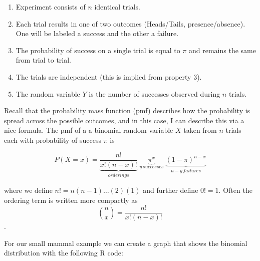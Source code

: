 \documentclass[]{book}
\newenvironment{Shaded}{\begin{snugshade}}{\end{snugshade}}
\newcommand{\KeywordTok}[1]{\textcolor[rgb]{0.13,0.29,0.53}{\textbf{{#1}}}}
\newcommand{\DataTypeTok}[1]{\textcolor[rgb]{0.13,0.29,0.53}{{#1}}}
\newcommand{\DecValTok}[1]{\textcolor[rgb]{0.00,0.00,0.81}{{#1}}}
\newcommand{\FloatTok}[1]{\textcolor[rgb]{0.00,0.00,0.81}{{#1}}}
\newcommand{\StringTok}[1]{\textcolor[rgb]{0.31,0.60,0.02}{{#1}}}
\newcommand{\NormalTok}[1]{{#1}}
\providecommand{\tightlist}{%
  \setlength{\itemsep}{0pt}\setlength{\parskip}{0pt}}
\begin{document}
\begin{enumerate}
\def\labelenumi{\arabic{enumi}.}
\tightlist
\item
  Experiment consists of \(n\) identical trials.
\item
  Each trial results in one of two outcomes (Heads/Tails,
  presence/absence). One will be labeled a success and the other a
  failure.
\item
  The probability of success on a single trial is equal to \(\pi\) and
  remains the same from trial to trial.
\item
  The trials are independent (this is implied from property 3).
\item
  The random variable \(Y\) is the number of successes observed during
  \(n\) trials.
\end{enumerate}

Recall that the probability mass function (pmf) describes how the
probability is spread across the possible outcomes, and in this case, I
can describe this via a nice formula. The pmf of a a binomial random
variable \(X\) taken from \(n\) trials each with probability of success
\(\pi\) is

\[P(X=x)=\underbrace{\frac{n!}{x!(n-x)!}}_{orderings}\;\underbrace{\pi^{x}}_{y\,successes}\;\underbrace{(1-\pi)^{n-x}}_{n-y\,failures}\]

where we define \(n!=n(n-1)\dots(2)(1)\) and further define \(0!=1\).
Often the ordering term is written more compactly as
\[{n \choose x}=\frac{n!}{x!\left(n-x\right)!}\].

For our small mammal example we can create a graph that shows the
binomial distribution with the following R code:

\begin{Shaded}
\end{Shaded}
\end{document}
